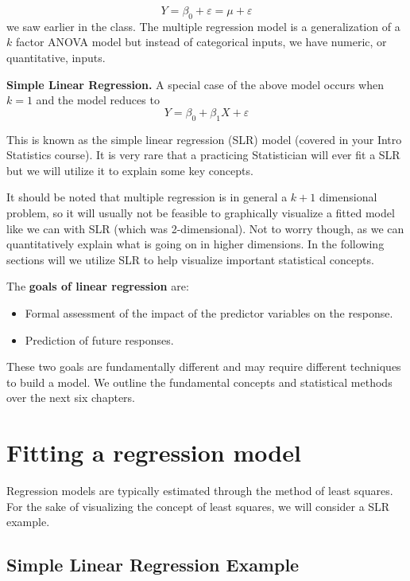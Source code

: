 \documentclass[
]{book}
\providecommand{\tightlist}{%
  \setlength{\itemsep}{0pt}\setlength{\parskip}{0pt}}
\begin{document}
\[Y=\beta_0 + \varepsilon = \mu + \varepsilon\]
we saw earlier in the class.
The multiple regression model is a generalization of a \(k\) factor ANOVA model but instead of categorical inputs, we have numeric, or quantitative, inputs.

\textbf{Simple Linear Regression.} A special case of the above model occurs when \(k=1\) and the model reduces to
\[Y = \beta_0 + \beta_1 X + \varepsilon\]

This is known as the simple linear regression (SLR) model (covered in your Intro Statistics course).
It is very rare that a practicing Statistician will ever fit a SLR but we will utilize it to explain some key concepts.

It should be noted that multiple regression is in general a \(k + 1\) dimensional problem, so it will usually not be feasible to graphically visualize a fitted model like we can with SLR (which was 2-dimensional).
Not to worry though, as we can quantitatively explain what is going on in higher dimensions.
In the following sections will we utilize SLR to help visualize important statistical concepts.

The \textbf{goals of linear regression} are:

\begin{itemize}
\tightlist
\item
  Formal assessment of the impact of the predictor variables on the response.
\item
  Prediction of future responses.
\end{itemize}

These two goals are fundamentally different and may require different techniques to build a model.
We outline the fundamental concepts and statistical methods over the next six chapters.

\hypertarget{fitting-a-regression-model}{%
\section{Fitting a regression model}\label{fitting-a-regression-model}}

Regression models are typically estimated through the method of least squares.
For the sake of visualizing the concept of least squares, we will consider a SLR example.

\hypertarget{simple-linear-regression-example}{%
\subsection{Simple Linear Regression Example}\label{simple-linear-regression-example}}
\end{document}
